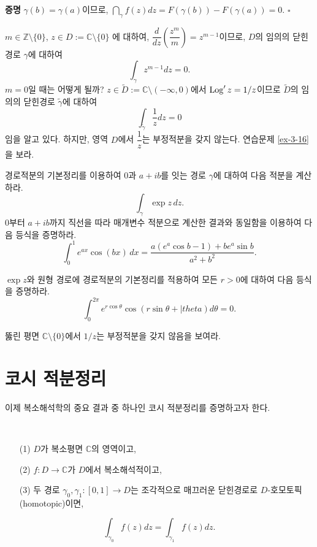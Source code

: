 {\bf 증명}
$\gamma(b)=\gamma(a)$이므로,
$\dint_\gamma f(z)dz = F(\gamma(b)) - F(\gamma(a)) = 0$.
\hfill $\square$

\begin{salt_example}\label{example-3-7}
$m\in\mathbb Z\setminus \{0\}$, $z\in D:=\mathbb C \setminus\{0\}$
에 대하여, 
$\dfrac d{dz}\left( \dfrac{z^m}m\right) = z^{m-1}$이므로,
$D$의 임의의 닫힌경로 $\gamma$에 대하여
\[
\int_\gamma z^{m-1}dz = 0.
\]
$m=0$일 때는 어떻게 될까?
$z\in\tilde D:= \mathbb C \setminus (-\infty,0)$에서
$\mathop{\mathrm{Log}}' z = 1/z$이므로 $\tilde D$의 임의의 닫힌경로 $\tilde \gamma$에 대하여
\[
\int_{\tilde\gamma} \frac1z dz = 0
\]
임을 알고 있다. 하지만, 영역 $D$에서 $\dfrac 1z$는 부정적분을 갖지 않는다.
연습문제 \ref{ex-3-16}을 보라.
\end{salt_example}

\begin{salt_exercise} \label{ex-3-14}
경로적분의 기본정리를 이용하여 
$0$과 $a+ib$를 잇는 경로 $\gamma$에 대하여
다음 적분을 계산하라.
\[
\int_\gamma \exp z \, dz.
\]
$0$부터 $a+ib$까지 직선을 따라 매개변수 적분으로 계산한 결과와 동일함을 이용하여
다음 등식을 증명하라.
\[
\int_0^1 e^{ax}\cos(bx)\, dx = \dfrac{a(e^a\cos b - 1) + be^a\sin b}{a^2+b^2}.
\]
\end{salt_exercise}

\begin{salt_exercise} \label{ex-3-15}
$\exp z$와 원형 경로에 경로적분의 기본정리를 적용하여
모든 $r>0$에 대하여 다음 등식을 증명하라.
\[
\int_0^{2\pi} e^{r\cos\theta} \cos(r\sin\theta+|theta)d\theta = 0.
\]
\end{salt_exercise}

\begin{salt_exercise} \label{ex-3-16}
뚫린 평면 $\mathbb C\setminus \{0\}$에서 $1/z$는 부정적분을 갖지 않음을 보여라.
\end{salt_exercise}

\section{코시 적분정리}

이제 복소해석학의 중요 결과 중 하나인 코시 적분정리를 증명하고자 한다.

\begin{salt_theorem} [코시 적분정리] \label{thm-3-4}
\
\begin{itemize}
\item[(1)] $D$가 복소평면 $\mathbb C$의 영역이고,
\item[(2)] $f:D\to\mathbb C$가 $D$에서 복소해석적이고,
\item[(3)] 두 경로 $\gamma_0, \gamma_1 :[0,1]\to D$는  조각적으로 매끄러운 닫힌경로로
$D$-호모토픽(homotopic)이면,
\end{itemize}
\[
\int_{\gamma_0} f(z)dz = \int_{\gamma_1} f(z)dz.
\]
\end{salt_theorem}

